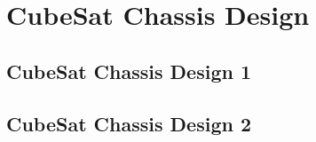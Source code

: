 \section{CubeSat Chassis Design}



\subsection{CubeSat Chassis Design 1}

\subsection{CubeSat Chassis Design 2}